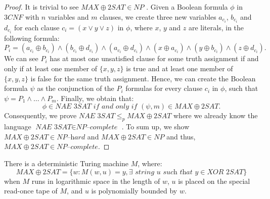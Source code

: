 \documentclass[a4paper,UKenglish,cleveref, autoref]{lipics-v2019}
\begin{document}
\begin{proof}
It is trivial to see $MAX\oplus2SAT \in NP$ \cite{Pap03}. Given a Boolean formula $\phi$ in $3CNF$ with $n$ variables and $m$ clauses, we create three new variables $a_{c_{i}}$, $b_{c_{i}}$ and $d_{c_{i}}$ for each clause $c_{i} = (x \vee y \vee z)$ in $\phi$, where $x$, $y$ and $z$ are literals, in the following formula:
\[P_{i} = (a_{c_{i}} \oplus b_{c_{i}}) \wedge (b_{c_{i}} \oplus d_{c_{i}}) \wedge (a_{c_{i}} \oplus d_{c_{i}}) \wedge (x \oplus a_{c_{i}}) \wedge (y \oplus b_{c_{i}}) \wedge (z \oplus d_{c_{i}}).\]
We can see $P_{i}$ has at most one unsatisfied clause for some truth assignment if and only if at least one member of $\{x,y,z\}$ is true and at least one member of $\{x,y,z\}$ is false for the same truth assignment. Hence, we can create the Boolean formula $\psi$ as the conjunction of the $P_{i}$ formulas for every clause $c_{i}$ in $\phi$, such that $\psi = P_{1} \wedge \ldots \wedge P_{m}$. Finally, we obtain that:
\[\phi \in \textit{NAE 3SAT} \textit{ if and only if } (\psi, m) \in MAX\oplus2SAT.\]
Consequently, we prove $\textit{NAE 3SAT} \leq_{p} MAX\oplus2SAT$ where we already know the language $\textit{NAE 3SAT} \in \textit{NP--complete}$ \cite{GJ79}. To sum up, we show $MAX\oplus2SAT \in \textit{NP--hard}$ and $MAX\oplus2SAT \in NP$ and thus, $MAX\oplus2SAT \in \textit{NP--complete}$.
\end{proof}

\begin{theorem}
\label{proof}
There is a deterministic Turing machine $M$, where:
\[MAX\oplus2SAT = \{w: M(w, u) = y, \exists \textit{ string } u \textit{ such that } y \in \textit{XOR 2SAT}\}\]
when $M$ runs in logarithmic space in the length of $w$, $u$ is placed on the special read-once tape of $M$, and $u$ is polynomially bounded by $w$.
\end{theorem}
\end{document}
